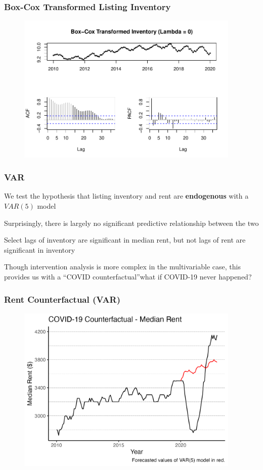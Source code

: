 \documentclass[t]{beamer}
\let\tempone\itemize
\let\temptwo\enditemize
\renewenvironment{itemize}{\tempone\addtolength{\itemsep}{0.5\baselineskip}}{\temptwo}
\begin{document}
\begin{frame}
\frametitle{Box-Cox Transformed Listing Inventory}
\begin{figure}
\includegraphics[width=4.2in]{box_cox_inventory.pdf}
\end{figure}
\end{frame}

\begin{frame}
\frametitle{VAR}
\begin{itemize}
\item We test the hypothesis that listing inventory and rent are \textbf{endogenous} with a $VAR(5)$ model
\item Surprisingly, there is largely no significant predictive relationship between the two
\item Select lags of inventory are significant in median rent, but not lags of rent are significant in inventory
\item Though intervention analysis is more complex in the multivariable case, this provides us with a ``COVID counterfactual''\textemdash\text{ }what if COVID-19 never happened?

\end{itemize}
\end{frame}

\begin{frame}
\frametitle{Rent Counterfactual (VAR)}
\begin{figure}
\includegraphics[width=4.2in]{rent_counterfactual.png}
\end{figure}
\end{frame}
\end{document}
